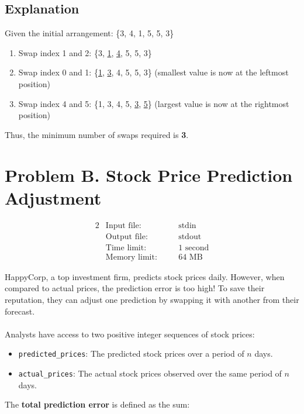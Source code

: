\documentclass[12pt,a4paper]{article}
\begin{document}
\subsection*{\fontsize{16}{12}Explanation}
Given the initial arrangement: \{3, 4, 1, 5, 5, 3\}

\begin{enumerate}
    \item Swap index 1 and 2: \{3, \underline{1}, \underline{4}, 5, 5, 3\}
    \item Swap index 0 and 1: \{\underline{1}, \underline{3}, 4, 5, 5, 3\} (smallest value is now at the leftmost position)
    \item Swap index 4 and 5: \{1, 3, 4, 5, \underline{3}, \underline{5}\} (largest value is now at the rightmost position)
\end{enumerate}
Thus, the minimum number of swaps required is \textbf{3}.
\newpage
\section*{\fontsize{18}{12}Problem B. Stock Price Prediction Adjustment}

\begin{alignat*} {2}
 &   \text{Input file:}   \quad     &&\text{stdin}\\
 &   \text{Output file:}  \quad     &&\text{stdout}\\
 &   \text{Time limit:}   \quad     &&\text{1 second}\\
 &   \text{Memory limit:} \quad     &&\text{64 MB}
\end{alignat*}

\noindent
HappyCorp, a top investment firm, predicts stock prices daily. However, when compared to actual prices, the prediction error is too high! To save their reputation, they can adjust one prediction by swapping it with another from their forecast. 
\\\\
\noindent
Analysts have access to two positive integer sequences of stock prices:

\begin{itemize}
    \item \texttt{predicted\_prices}: The predicted stock prices over a period of $n$ days.
    \item \texttt{actual\_prices}: The actual stock prices observed over the same period of $n$ days.
\end{itemize}

\noindent 
The \textbf{total prediction error} is defined as the sum:
\end{document}
